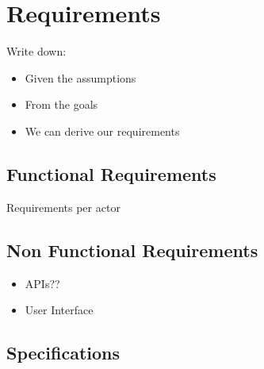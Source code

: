 \chapter{Requirements}

	Write down:
	\begin{itemize}
		\item Given the assumptions
		\item From the goals
		\item We can derive our requirements
	\end{itemize}

	\section{Functional Requirements}

		Requirements per actor

	\section{Non Functional Requirements}
		\begin{itemize}
			\item APIs??
			\item User Interface
		\end{itemize}

	\section{Specifications}